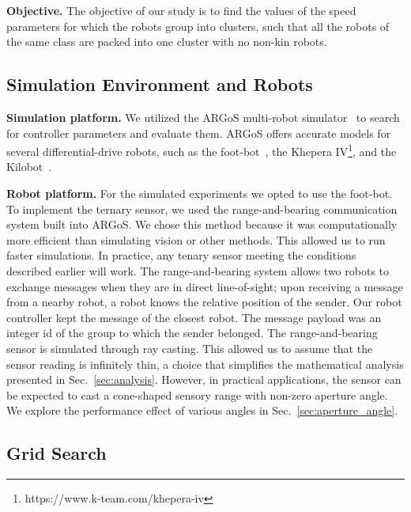 \documentclass[letterpaper, 10 pt, conference]{ieeeconf}
\newcommand{\myparagraph}[1]{\textbf{#1.}}
\begin{document}
\myparagraph{Objective}
The objective of our study is to find the values of the speed parameters for
which the robots group into clusters, such that all the robots of the same class
are packed into one cluster with no non-kin robots.

\subsection{Simulation Environment and Robots}

\myparagraph{Simulation platform} We utilized the ARGoS multi-robot
simulator~\cite{pinciroli_argos:_2012} to search for controller parameters and
evaluate them. ARGoS offers accurate models for several differential-drive
robots, such as the foot-bot~\cite{Bonani2010}, the Khepera
IV\footnote{https://www.k-team.com/khepera-iv}, and the
Kilobot~\cite{Rubenstein2012}.

\myparagraph{Robot platform}
For the simulated experiments we opted to use the foot-bot.
To implement the ternary sensor, we used the range-and-bearing communication system
built into ARGoS. We chose this method because it was computationally more efficient
than simulating vision or other methods. This allowed us to run faster simulations.
In practice, any tenary sensor meeting the conditions described earlier will work.
The range-and-bearing system allows two robots to exchange messages when they are in direct line-of-sight;
upon receiving a message from a nearby robot, a robot knows the relative position of the sender.
Our robot controller kept the message of the closest robot.
The message payload was an integer id of the group to which the sender belonged.
The range-and-bearing sensor is simulated through ray casting.
This allowed us to assume that the sensor reading is infinitely thin, a
choice that simplifies the mathematical analysis presented in
Sec.~\ref{sec:analysis}. However, in practical applications, the sensor can be
expected to cast a cone-shaped sensory range with non-zero aperture angle. We
explore the performance effect of various angles in
Sec.~\ref{sec:aperture_angle}.

\subsection{Grid Search}
\label{sec:gridsearch}
\end{document}
